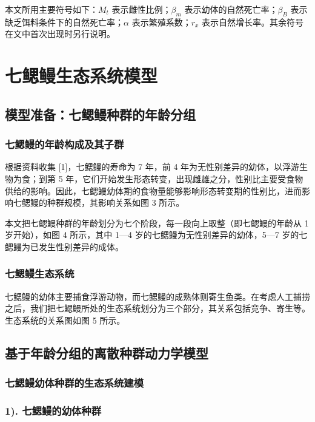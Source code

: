\documentclass[11pt,a4paper]{ctexart}
\begin{document}
本文所用主要符号如下：$M_t$ 表示雌性比例；$\beta_m$ 表示幼体的自然死亡率；$\beta_B$ 表示缺乏饵料条件下的自然死亡率；$\alpha$ 表示繁殖系数；$r_x$ 表示自然增长率。其余符号在文中首次出现时另行说明。

\section{七鳃鳗生态系统模型}

\subsection{模型准备：七鳃鳗种群的年龄分组}

\subsubsection{七鳃鳗的年龄构成及其子群}

根据资料收集 [1]，七鳃鳗的寿命为 7 年，前 4 年为无性别差异的幼体，以浮游生物为食；到第 5 年，它们开始发生形态转变，出现雌雄之分，性别比主要受食物供给的影响。因此，七鳃鳗幼体期的食物量能够影响形态转变期的性别比，进而影响七鳃鳗的种群规模，其影响关系如图 3 所示。

本文把七鳃鳗种群的年龄划分为七个阶段，每一段向上取整（即七鳃鳗的年龄从 1 岁开始），如图 4 所示，其中 1—4 岁的七鳃鳗为无性别差异的幼体，5—7 岁的七鳃鳗为已发生性别差异的成体。

\subsubsection{七鳃鳗生态系统}

七鳃鳗的幼体主要捕食浮游动物，而七鳃鳗的成熟体则寄生鱼类。在考虑人工捕捞之后，我们把七鳃鳗所处的生态系统划分为三个部分，其关系包括竞争、寄生等。生态系统的关系图如图 5 所示。

\subsection{基于年龄分组的离散种群动力学模型}

\subsubsection{七鳃鳗幼体种群的生态系统建模}

\subsubsection*{1). 七鳃鳗的幼体种群}
\end{document}
